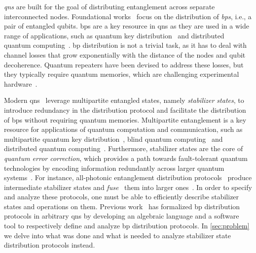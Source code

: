 
\emph{\Acp{qn}} are built for the goal of distributing entanglement across separate interconnected nodes.
%
Foundational works~\cite{zhu2025remote} focus on the distribution of \emph{\acp{bp}}, i.e., a pair of  entangled qubits. \Acp{bp} are a key resource in \acp{qn} as they are used in a wide range of applications, such as quantum key distribution~\cite{} and distributed quantum computing~\cite{caleffi2024dqcsurvey}.
%
\Ac{bp} distribution is not a trivial task, as it has to deal with channel losses that grow exponentially with the distance of the nodes and qubit decoherence. Quantum repeaters have been devised to address these losses, but they typically require quantum memories, which are challenging experimental hardware~\cite{}.

Modern \acp{qn}~\cite{munro2012,azuma2015_all-photonic,naphan2026bridging,niu2023_all-photonic} leverage multipartite entangled states, namely \emph{stabilizer states}, to introduce redundancy in the distribution protocol and facilitate the distribution of \acp{bp} without requiring quantum memories.
%
Multipartite entanglement is a key resource for applications of quantum computation and communication,
such as multipartite quantum key distribution~\cite{epping2017multipartiteqkd,murta2020cka}, 
blind quantum computing~\cite{} 
and distributed quantum computing~\cite{caleffi2024dqcsurvey}.
Furthermore, stabilizer states are the core of \emph{quantum error correction}, which provides a path towards fault-tolerant quantum technologies by encoding information redundantly across larger quantum systems~\cite{nielsen2010quantum}.
%
For instance, all-photonic entanglement distribution protocols~\cite{azuma2015_all-photonic,naphan2026bridging} produce intermediate stabilizer states and \emph{fuse}~\cite{loebl2025bellfusion} them into larger ones~\cite{fischer2020distributinggraph}.
In order to specify and analyze these protocols, one %
must be able to efficiently describe stabilizer states and operations on them.
%
%
Previous work~\cite{buckley2024bellkat,buckley2025pbkat,lacorte2026pbkatQCNC} has formalized \ac{bp} distribution protocols in arbitrary \acp{qn} by developing an algebraic language and a software tool to respectively define and analyze \ac{bp} distribution protocols. In \cref{sec:problem} we delve into what was done and what is needed to analyze stabilizer state distribution protocols instead.

